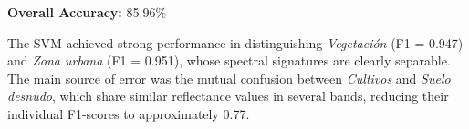 \noindent\textbf{Overall Accuracy:} 85.96\%

\vspace{0.3cm}
\noindent The SVM achieved strong performance in distinguishing
\textit{Vegetaci\'on} (F1 = 0.947) and \textit{Zona urbana}
(F1 = 0.951), whose spectral signatures are clearly separable.
The main source of error was the mutual confusion between
\textit{Cultivos} and \textit{Suelo desnudo}, which share similar
reflectance values in several bands, reducing their individual
F1-scores to approximately 0.77.
